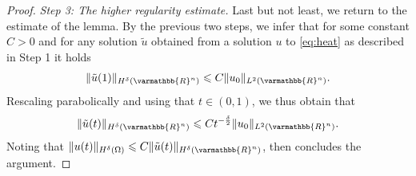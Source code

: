 \documentclass[12pt,twoside]{amsart}
\numberwithin{equation}{section}
\renewcommand{\leq}{\leqslant}
\renewcommand{\mathbb}{\varmathbb}
\newcommand {\R} {\mathbb{R}} \newcommand {\Z} {\mathbb{Z}}
\begin{document}
\begin{proof}
\emph{Step 3: The higher regularity estimate.}
Last but not least, we return to the estimate of the lemma. By the previous two steps, we infer that for some constant $C>0$ and for any solution $\tilde{u}$ obtained from a solution $u$ to \eqref{eq:heat} as described in Step 1 it holds
\begin{align*}
\|\tilde{u}(1)\|_{H^{\delta}(\R^n)} \leq C \|u_0\|_{L^2(\R^{n})}.
\end{align*}
Rescaling parabolically and using that $t\in (0,1)$, we thus obtain that
\begin{align*}
\|\tilde{u}(t)\|_{H^{\delta}(\R^n )} \leq C t^{-\frac{\delta}{2}} \|u_0\|_{L^2(\R^{n})}.
\end{align*}
Noting that $\|u(t)\|_{H^{\delta}(\Omega)}\leq C \|\tilde{u}(t)\|_{H^{\delta}(\R^n )} $, then concludes the argument.
\end{proof}
\end{document}
